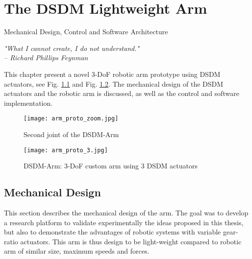 \chapter{The DSDM Lightweight Arm }
\label{sec:ExperimentalValidation}

\vspace{-5pt}
{ \Large Mechanical Design, Control and Software Architecture }

{
\begin{flushright}
\textit{"What I cannot create, I do not understand."} \\ 
\emph{-- Richard Phillips Feynman}
\end{flushright}
}
\vspace{10pt}



This chapter present a novel 3-DoF robotic arm prototype using DSDM actuators, see Fig. \ref{fig:dsdm_arm_zoom} and Fig. \ref{fig:dsdm_arm}. The mechanical design of the DSDM actuators and the robotic arm is discussed, as well as the control and software implementation.

\begin{figure}[htb]
	\centering
		\texttt{[image: arm\_proto\_zoom.jpg]}
	\caption{Second joint of the DSDM-Arm}
	\label{fig:dsdm_arm_zoom}
\end{figure}

\begin{figure}[htp]
	\centering
		\texttt{[image: arm\_proto\_3.jpg]}
	\caption{DSDM-Arm: 3-DoF custom arm using 3 DSDM actuators}
	\label{fig:dsdm_arm}
\end{figure}

\section{Mechanical Design}

This section describes the mechanical design of the arm. The goal was to develop a research platform to validate experimentally the ideas proposed in this thesis, but also to demonstrate the advantages of robotic systems with variable gear-ratio actuators. This arm is thus design to be light-weight compared to robotic arm of similar size, maximum speeds and forces. 

